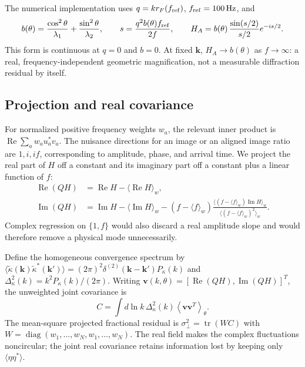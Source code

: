 The numerical implementation uses
$q=k r_F(f_{\rm ref})$, $f_{\rm ref}=100\,\mathrm{Hz}$, and
\begin{equation}
 b(\theta)=\frac{\cos^2\theta}{\lambda_1}
           +\frac{\sin^2\theta}{\lambda_2},\qquad
 s=\frac{q^2b(\theta)f_{\rm ref}}{2f},\qquad
 H_A=b(\theta)\,\frac{\sin(s/2)}{s/2}e^{-is/2}.
\end{equation}
This form is continuous at $q=0$ and $b=0$.  At fixed $\boldsymbol{k}$,
$H_A\to b(\theta)$ as $f\to\infty$: a real, frequency-independent
geometric magnification, not a measurable diffraction residual by itself.

\subsection{Projection and real covariance}

For normalized positive frequency weights $w_a$, the relevant inner
product is $\operatorname{Re}\sum_a w_a u_a^*v_a$.
The nuisance directions for an image or an aligned image ratio are
$1,i,if$, corresponding to amplitude, phase, and arrival time.  We project
the real part of $H$ off a constant and its imaginary part off a constant
plus a linear function of $f$:
\begin{align}
 \operatorname{Re}(QH)&=\operatorname{Re}H-
                  \langle\operatorname{Re}H\rangle_w,\\
 \operatorname{Im}(QH)&=\operatorname{Im}H-
                  \langle\operatorname{Im}H\rangle_w
 -(f-\langle f\rangle_w)
  \frac{\langle(f-\langle f\rangle_w)\operatorname{Im}H\rangle_w}
       {\langle(f-\langle f\rangle_w)^2\rangle_w}.
 \label{eq:real-projection}
\end{align}
Complex regression on $\{1,f\}$ would also discard a real amplitude
slope and would therefore remove a physical mode unnecessarily.

Define the homogeneous convergence spectrum by
$\langle\widetilde\kappa(\boldsymbol{k})
\widetilde\kappa^*(\boldsymbol{k}')\rangle
=(2\pi)^2\delta^{(2)}(\boldsymbol{k}-\boldsymbol{k}')P_\kappa(k)$
and $\Delta_\kappa^2(k)=k^2P_\kappa(k)/(2\pi)$.
Writing
$\boldsymbol{v}(k,\theta)=[\operatorname{Re}(QH),
\operatorname{Im}(QH)]^T$, the unweighted joint covariance is
\begin{equation}
 C=\int d\ln k\,\Delta_\kappa^2(k)
       \left\langle\boldsymbol{v}\boldsymbol{v}^{T}\right\rangle_\theta.
 \label{eq:real-covariance}
\end{equation}
The mean-square projected fractional residual is
$\sigma_\perp^2=\operatorname{tr}(WC)$ with
$W=\operatorname{diag}(w_1,\ldots,w_N,w_1,\ldots,w_N)$.
The real field makes the complex fluctuations noncircular; the joint
real covariance retains information lost by keeping only
$\langle\eta\eta^*\rangle$.

